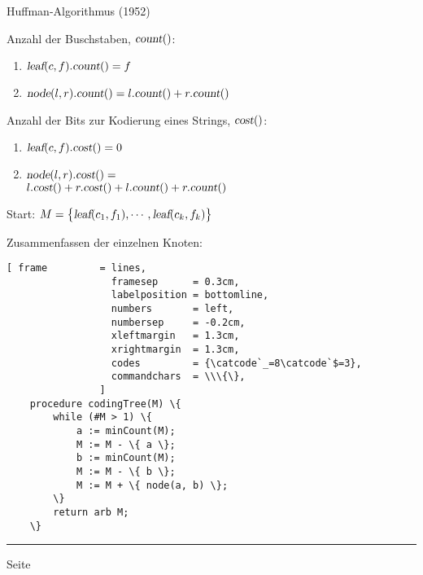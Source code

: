 \documentclass{slides}
\newcounter{mypage}
\begin{document}
\begin{slide}{}
\normalsize

\begin{center}
Huffman-Algorithmus (1952)
\end{center}
\vspace*{0.5cm}

\footnotesize

Anzahl der Buschstaben, $\textsl{count}()$:
\begin{enumerate}
\item $\textsl{leaf}(c,f).\textsl{count}() = f$
\item $\textsl{node}(l,r).\textsl{count}() = l.\textsl{count}() + r.\textsl{count}()$
\end{enumerate}


Anzahl der Bits zur Kodierung eines Strings, $\textsl{cost}()$:
\begin{enumerate}
\item $\textsl{leaf}(c,f).\textsl{cost}() = 0$
\item $\textsl{node}(l,r).\textsl{cost}() = $
      \\[0.2cm]
      \hspace*{1.3cm}
      $l.\textsl{cost}() + r.\textsl{cost}() + l.\textsl{count}() + r.\textsl{count}()$
\end{enumerate}

Start: \quad
$M = \bigl\{ \textsl{leaf}(c_1,f_1), \cdots, \textsl{leaf}(c_k,f_k) \bigr\}$

Zusammenfassen der einzelnen Knoten:
\begin{Verbatim}[ frame         = lines, 
                  framesep      = 0.3cm, 
                  labelposition = bottomline,
                  numbers       = left,
                  numbersep     = -0.2cm,
                  xleftmargin   = 1.3cm,
                  xrightmargin  = 1.3cm,
                  codes         = {\catcode`_=8\catcode`$=3},
                  commandchars  = \\\{\},
                ]
    procedure codingTree(M) \{
        while (#M > 1) \{
            a := minCount(M);
            M := M - \{ a \};
            b := minCount(M);
            M := M - \{ b \};
            M := M + \{ node(a, b) \};
        \}
        return arb M;
    \}
\end{Verbatim} 

\vspace*{\fill}
\tiny \addtocounter{mypage}{1}
\rule{17cm}{1mm}
 \hspace*{\fill} Seite 
\end{slide}
\end{document}

